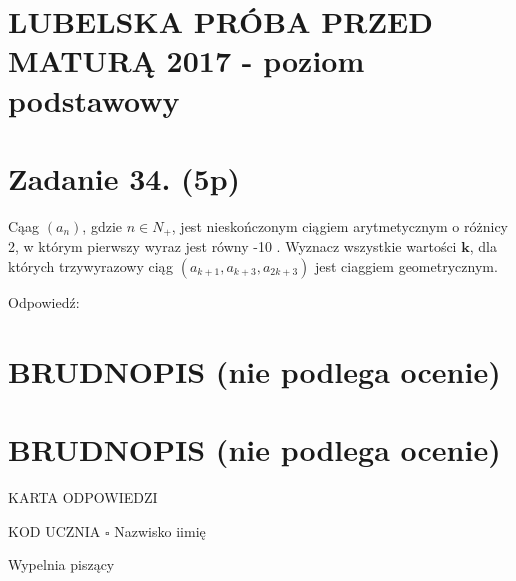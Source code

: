 \documentclass[10pt]{article}
\begin{document}
\section*{LUBELSKA PRÓBA PRZED MATURĄ 2017 - poziom podstawowy}
\section*{Zadanie 34. (5p)}
Cąag \(\left(a_{n}\right)\), gdzie \(n \in N_{+}\), jest nieskończonym ciągiem arytmetycznym o różnicy 2, w którym pierwszy wyraz jest równy -10 . Wyznacz wszystkie wartości \(\boldsymbol{k}\), dla których trzywyrazowy ciąg \(\left(a_{k+1}, a_{k+3}, a_{2 k+3}\right)\) jest ciaggiem geometrycznym.

Odpowiedź:

\section*{BRUDNOPIS (nie podlega ocenie)}
\section*{BRUDNOPIS (nie podlega ocenie)}
KARTA ODPOWIEDZI

KOD UCZNIA \(\square\) Nazwisko iimię

Wypelnia piszący
\end{document}
